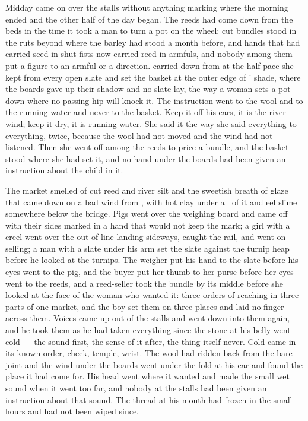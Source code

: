 Midday came on over the stalls without anything marking where the morning ended and the other half of the day began. The reeds had come down from the beds in the time it took a man to turn a pot on the wheel: cut bundles stood in the ruts beyond  where the barley had stood a month before, and hands that had carried seed in shut fists now carried reed in armfuls, and nobody among them put a figure to an armful or a direction.  carried  down from  at the half-pace she kept from every open slate and set the basket at the outer edge of ' shade, where the boards gave up their shadow and no slate lay, the way a woman sets a pot down where no passing hip will knock it. The instruction went to the wool and to the running water and never to the basket. Keep it off his ears, it is the river wind; keep it dry, it is running water. She said it the way she said everything to everything, twice, because the wool had not moved and the wind had not listened. Then she went off among the reeds to price a bundle, and the basket stood where she had set it, and no hand under the boards had been given an instruction about the child in it.

The market smelled of cut reed and river silt and the sweetish breath of glaze that came down on a bad wind from , with hot clay under all of it and eel slime somewhere below the bridge. Pigs went over the weighing board and came off with their sides marked in a hand that would not keep the mark; a girl with a creel went over the out-of-line landing sideways, caught the rail, and went on selling; a man with a slate under his arm set the slate against the turnip heap before he looked at the turnips. The weigher put his hand to the slate before his eyes went to the pig, and the buyer put her thumb to her purse before her eyes went to the reeds, and a reed-seller took the bundle by its middle before she looked at the face of the woman who wanted it: three orders of reaching in three parts of one market, and the boy set them on three places and laid no finger across them. Voices came up out of the stalls and went down into them again, and he took them as he had taken everything since the stone at his belly went cold --- the sound first, the sense of it after, the thing itself never. Cold came in its known order, cheek, temple, wrist. The wool had ridden back from the bare joint and the wind under the boards went under the fold at his ear and found the place it had come for. His head went where it wanted and made the small wet sound when it went too far, and nobody at the stalls had been given an instruction about that sound. The thread at his mouth had frozen in the small hours and had not been wiped since.

